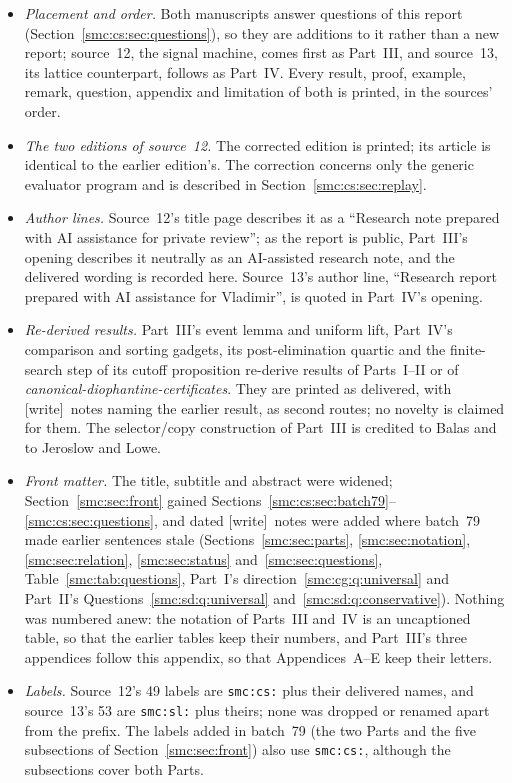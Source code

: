 \documentclass[11pt,letterpaper]{article}
\numberwithin{equation}{section}
\theoremstyle{definition}
\theoremstyle{remark}
\newcommand{\wtag}{\textup{[write]}}
\begin{document}
\begin{itemize}
\item \emph{Placement and order.} Both manuscripts answer questions of this report (Section~\ref{smc:cs:sec:questions}), so they are additions to it rather than a new report; source~12, the signal machine, comes first as Part~III, and source~13, its lattice counterpart, follows as Part~IV. Every result, proof, example, remark, question, appendix and limitation of both is printed, in the sources' order.
\item \emph{The two editions of source~12.} The corrected edition is printed; its article is identical to the earlier edition's. The correction concerns only the generic evaluator program and is described in Section~\ref{smc:cs:sec:replay}.
\item \emph{Author lines.} Source~12's title page describes it as a ``Research note prepared with AI assistance for private review''; as the report is public, Part~III's opening describes it neutrally as an AI-assisted research note, and the delivered wording is recorded here. Source~13's author line, ``Research report prepared with AI assistance for Vladimir'', is quoted in Part~IV's opening.
\item \emph{Re-derived results.} Part~III's event lemma and uniform lift, Part~IV's comparison and sorting gadgets, its post-elimination quartic and the finite-search step of its cutoff proposition re-derive results of Parts~I--II or of \emph{canonical-diophantine-certificates}. They are printed as delivered, with \wtag\ notes naming the earlier result, as second routes; no novelty is claimed for them. The selector/copy construction of Part~III is credited to Balas and to Jeroslow and Lowe.
\item \emph{Front matter.} The title, subtitle and abstract were widened; Section~\ref{smc:sec:front} gained Sections~\ref{smc:cs:sec:batch79}--\ref{smc:cs:sec:questions}, and dated \wtag\ notes were added where batch~79 made earlier sentences stale (Sections~\ref{smc:sec:parts}, \ref{smc:sec:notation}, \ref{smc:sec:relation}, \ref{smc:sec:status} and~\ref{smc:sec:questions}, Table~\ref{smc:tab:questions}, Part~I's direction~\ref{smc:cg:q:universal} and Part~II's Questions~\ref{smc:sd:q:universal} and~\ref{smc:sd:q:conservative}). Nothing was numbered anew: the notation of Parts~III and~IV is an uncaptioned table, so that the earlier tables keep their numbers, and Part~III's three appendices follow this appendix, so that Appendices~A--E keep their letters.
\item \emph{Labels.} Source~12's 49 labels are \texttt{smc:cs:} plus their delivered names, and source~13's 53 are \texttt{smc:sl:} plus theirs; none was dropped or renamed apart from the prefix. The labels added in batch~79 (the two Parts and the five subsections of Section~\ref{smc:sec:front}) also use \texttt{smc:cs:}, although the subsections cover both Parts.

\end{itemize}
\end{document}
